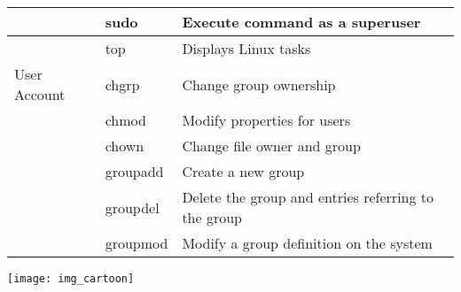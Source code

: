 \begin{tabular}{|p{0.6in}|p{0.7in}|p{2.9in}|}
& sudo & Execute command as a superuser \\ \hline
& top & Displays Linux tasks \\ \hline
User Account & chgrp & Change group ownership \\ \hline
& chmod & Modify properties for users \\ \hline
& chown & Change file owner and group \\ \hline
& groupadd & Create a new group \\ \hline
& groupdel & Delete the group and entries referring to the group \\ \hline
& groupmod & Modify a group definition on the system \\ \hline
\end{tabular}

\texttt{[image: img\_cartoon]}
